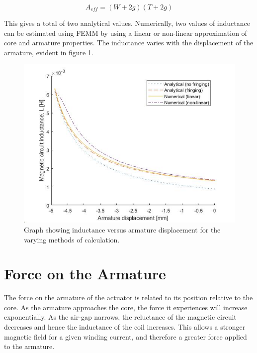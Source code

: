 \documentclass[a4paper]{IEEEtran}
\begin{document}
\begin{equation}
A_{eff} = (W + 2g)(T + 2g)
\label{EffectiveArea}
\end{equation}

This gives a total of two analytical values. Numerically, two values of inductance can be estimated using FEMM by using a linear or non-linear approximation of core and armature properties. The inductance varies with the displacement of the armature, evident in figure \ref{inductanceGraph}.

\begin{figure}[ht]
\includegraphics[width = \linewidth]{Inductances.jpg}
\caption{Graph showing inductance versus armature displacement for the varying methods of calculation.}
\label{inductanceGraph} 
\end{figure}


\section{Force on the Armature}

The force on the armature of the actuator is related to its position relative to the core. As the armature approaches the core, the force it experiences will increase exponentially. As the air-gap narrows, the reluctance of the magnetic circuit decreases and hence the inductance of the coil increases. This allows a stronger magnetic field for a given winding current, and therefore a greater force applied to the armature. 
\end{document}
